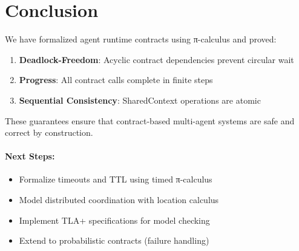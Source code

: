 \documentclass{article}
\begin{document}
\section{Conclusion}

We have formalized agent runtime contracts using π-calculus and proved:
\begin{enumerate}
\item \textbf{Deadlock-Freedom}: Acyclic contract dependencies prevent circular wait
\item \textbf{Progress}: All contract calls complete in finite steps
\item \textbf{Sequential Consistency}: SharedContext operations are atomic
\end{enumerate}

These guarantees ensure that contract-based multi-agent systems are safe and correct by construction.

\paragraph{Next Steps:}
\begin{itemize}
\item Formalize timeouts and TTL using timed π-calculus
\item Model distributed coordination with location calculus
\item Implement TLA+ specifications for model checking
\item Extend to probabilistic contracts (failure handling)
\end{itemize}
\end{document}
